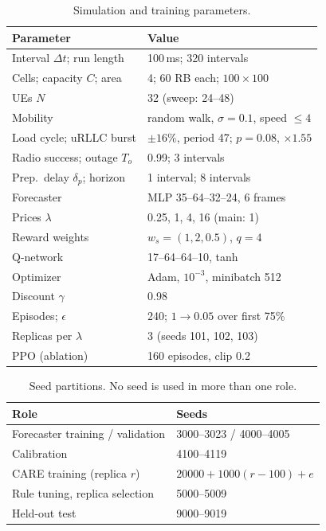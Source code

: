 \documentclass[conference]{IEEEtran}
\begin{document}
\begin{table}[!t]
\centering
\caption{Simulation and training parameters.}
\label{tab:params}
\footnotesize
\setlength{\tabcolsep}{4pt}
\begin{tabular}{ll}
\toprule
Parameter & Value\\
\midrule
Interval $\Delta t$; run length & 100\,ms; 320 intervals\\
Cells; capacity $C$; area & 4; 60 RB each; $100\times100$\\
UEs $N$ & 32 (sweep: 24--48)\\
Mobility & random walk, $\sigma=0.1$, speed $\le4$\\
Load cycle; uRLLC burst & $\pm16\%$, period 47; $p=0.08$, $\times1.55$\\
Radio success; outage $T_o$ & 0.99; 3 intervals\\
Prep.\ delay $\delta_p$; horizon & 1 interval; 8 intervals\\
Forecaster & MLP 35--64--32--24, 6 frames\\
Prices $\lambda$ & 0.25, 1, 4, 16 (main: 1)\\
Reward weights & $w_s=(1,2,0.5)$, $q=4$\\
Q-network & 17--64--64--10, tanh\\
Optimizer & Adam, $10^{-3}$, minibatch 512\\
Discount $\gamma$ & 0.98\\
Episodes; $\epsilon$ & 240; $1\to0.05$ over first 75\%\\
Replicas per $\lambda$ & 3 (seeds 101, 102, 103)\\
PPO (ablation) & 160 episodes, clip 0.2\\
\bottomrule
\end{tabular}
\end{table}

\begin{table}[!t]
\centering
\caption{Seed partitions. No seed is used in more than one role.}
\label{tab:seeds}
\begin{tabular}{ll}
\toprule
Role & Seeds\\
\midrule
Forecaster training / validation & 3000--3023 / 4000--4005\\
Calibration & 4100--4119\\
CARE training (replica $r$) & $20000+1000(r-100)+e$\\
Rule tuning, replica selection & 5000--5009\\
Held-out test & 9000--9019\\
\bottomrule
\end{tabular}
\end{table}
\end{document}
